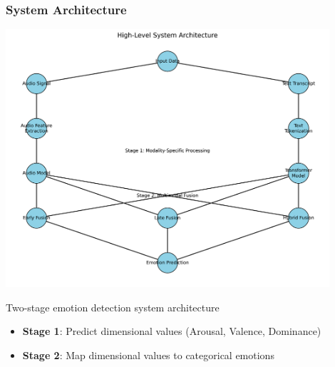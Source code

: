 \documentclass{beamer}
\begin{document}
\begin{frame}
\frametitle{System Architecture}
\begin{center}
\includegraphics[width=0.9\textwidth]{figures/system_architecture.png}
\caption{Two-stage emotion detection system architecture}
\end{center}

\begin{itemize}
    \item \textbf{Stage 1}: Predict dimensional values (Arousal, Valence, Dominance)
    \item \textbf{Stage 2}: Map dimensional values to categorical emotions
\end{itemize}
\end{frame}
\end{document}
